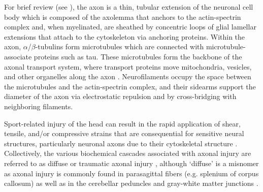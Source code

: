 \documentclass[12pt]{article}
\begin{document}
For brief review (see \textcite{krieg2023IdentifyingPhenotypesDiffuse}), the axon is a thin, tubular extension of the neuronal cell body which is composed of the axolemma that anchors to the actin-spectrin complex and, when myelinated, are sheathed by concentric loops of glial lamellar extensions that attach to the cytoskeleton via anchoring proteins. Within the axon, $\alpha$/$\beta$-tubulins form microtubules which are connected with microtubule-associate proteins such as tau. These microtubules form the backbone of the axonal transport system, where transport proteins move mitochondria, vesicles, and other organelles along the axon \parencite{shin2020AxonalTransportDysfunction}. Neurofilaments occupy the space between the microtubules and the actin-spectrin complex, and their sidearms support the diameter of the axon via electrostatic repulsion and by cross-bridging with neighboring filaments.

Sport-related injury of the head can result in the rapid application of shear, tensile, and/or compressive strains that are consequential for sensitive neural structures, particularly neuronal axons due to their cytoskeletal structure \parencite{elsayed2008BiomechanicsTraumaticBrain,johnson2013AxonalPathologyTraumatic,bar-kochba2016StrainRatedependentNeuronal}. Collectively, the various biochemical cascades associated with axonal injury are referred to as diffuse or traumatic axonal injury \parencite{krieg2023IdentifyingPhenotypesDiffuse}, although `diffuse' is a misnomer as axonal injury is commonly found in parasagittal fibers (e.g. splenium of corpus callosum) as well as in the cerebellar peduncles and gray-white matter junctions \parencite{jang2020DiagnosticProblemsDiffuse,fork2005NeuropsychologicalSequelaeDiffuse,meythaler2001CurrentConceptsDiffuse,johnson2013AxonalPathologyTraumatic,lindsey2023DiffusionWeightedImagingMild}.
\end{document}
